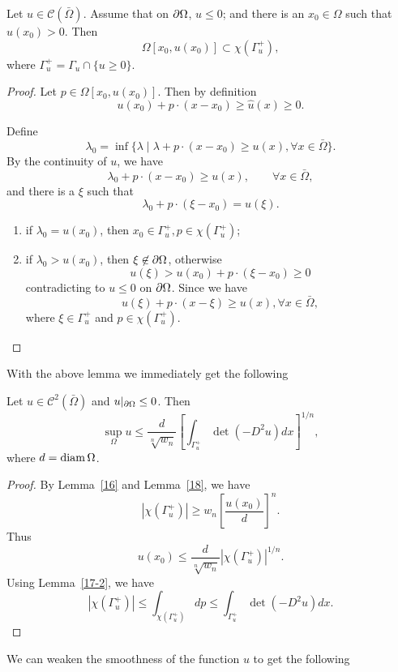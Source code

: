 \begin{lemma}\label{18} Let $u\in \mathcal C(\bar\Omega)$. Assume that on $\partial\Omega$, $u\leq 0$; and there is an  $x_0\in\Omega$ such that $u(x_0)>0$. Then
\[
\Omega[x_0,u(x_0)]\subset\chi(\Gamma^+_u),
\]
where $\Gamma_u^+=\Gamma_u\cap\{u\geq 0\}$.
\end{lemma}


\begin{proof} Let $p\in\Omega[x_0,u(x_0)]$. Then by definition
\[
u(x_0)+p\cdot (x-x_0)\geq\hat u(x)\geq 0.
\]

Define
\[
\lambda_0=\inf\{\lambda\mid\lambda+p\cdot (x-x_0)\geq u(x),\forall x\in\bar\Omega\}.
\]
By the continuity of $u$, we have
\[
\lambda_0+p\cdot (x-x_0)\geq u(x),\qquad\forall x\in\bar\Omega,
\]
and there is a $\xi$ such that 
\[
\lambda_0+p\cdot (\xi-x_0)=u(\xi).
\]

\begin{enumerate}
\item if $\lambda_0=u(x_0)$, then $x_0\in\Gamma_u^+, p\in\chi(\Gamma_u^+)$;
\item if $\lambda_0>u(x_0)$, then $\xi\not\in\partial\Omega$, otherwise
\[
u(\xi)>u(x_0)+p\cdot (\xi-x_0)\geq 0
\]
contradicting to $u\leq 0$ on $\partial\Omega$.  Since we have
\[
u(\xi)+p\cdot (x-\xi)\geq u(x), \forall x\in\bar\Omega,
\]
where $\xi\in\Gamma_u^+$ and $p\in\chi(\Gamma_u^+)$.
\end{enumerate}

\end{proof}

With the above lemma we  immediately get the following

\begin{lemma}\label{19} Let $u\in\mathcal  C^2(\bar\Omega)$ and $u|_{\partial\Omega}\leq 0$. Then
\[
\sup_\Omega u\leq\frac{d}{\sqrt[n]{w_n}}\left[\int_{\Gamma_u^+}\det(-D^2 u) dx\right]^{1/n},
\]
where $d={\rm diam}\,\Omega$.
\end{lemma}

\begin{proof} By Lemma~\ref{16} and Lemma~\ref{18}, we have
\[
|\chi(\Gamma_u^+)|\geq w_n\left[\frac{u(x_0)}{d}\right]^n.
\]
Thus
\[
u(x_0)\leq\frac{d}{\sqrt[n]{w_n}}|\chi(\Gamma_u^+)|^{1/n}.
\]
Using Lemma~\ref{17-2}, we have
\[
|\chi(\Gamma_u^+)|\leq \int_{\chi(\Gamma_u^+)} dp\leq\int_{\Gamma_u^+}\det(-D^2 u) dx.
\]

\end{proof}


We can weaken the smoothness of the function $u$ to get the following

